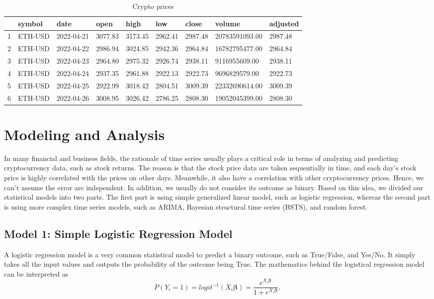 \documentclass{article}
\begin{document}
\begin{table}[ht]
\centering
\begin{tabular}{rllllllll}
  \hline
 & symbol & date & open & high & low & close & volume & adjusted \\ 
  \hline
1 & ETH-USD & 2022-04-21 & 3077.83 & 3173.45 & 2962.41 & 2987.48 & 20783591093.00 & 2987.48 \\ 
  2 & ETH-USD & 2022-04-22 & 2986.94 & 3024.85 & 2942.36 & 2964.84 & 16782795477.00 & 2964.84 \\ 
  3 & ETH-USD & 2022-04-23 & 2964.80 & 2975.32 & 2926.74 & 2938.11 & 9116955609.00 & 2938.11 \\ 
  4 & ETH-USD & 2022-04-24 & 2937.35 & 2961.88 & 2922.13 & 2922.73 & 9696829579.00 & 2922.73 \\ 
  5 & ETH-USD & 2022-04-25 & 2922.99 & 3018.42 & 2804.51 & 3009.39 & 22332690614.00 & 3009.39 \\ 
  6 & ETH-USD & 2022-04-26 & 3008.95 & 3026.42 & 2786.25 & 2808.30 & 19052045399.00 & 2808.30 \\ 
   \hline
\end{tabular}
\caption{Crypto prices} 
\label{Crypto prices}
\end{table}

\section{Modeling and Analysis}
In many financial and business fields, the rationale of time series usually plays a critical role in terms of analyzing and predicting cryptocurrency data, such as stock returns. The reason is that the stock price data are taken sequentially in time, and each day’s stock price is highly correlated with the prices on other days. Meanwhile, it also have a correlation with other cryptocurrency prices. Hence, we can’t assume the error are independent. In addition, we usually do not consider its outcome as binary. Based on this idea, we divided our statistical models into two parts. The first part is using simple generalized linear model, such as logistic regression, whereas the second part is using more complex time series models, such as ARIMA, Bayesian structural time series (BSTS), and random forest.\\

\subsection{Model 1: Simple Logistic Regression Model}
A logistic regression model is a very common statistical model to predict a binary outcome, such as True/False, and Yes/No. It simply takes all the input values and outputs the probability of the outcome being True. The mathematics behind the logistical regression model can be interpreted as
$$P(Y_i=1)=logit^{-1}(X_i\bm{\beta})=\frac{e^{X_i\bm{\beta}}}{1+e^{X_i\bm{\beta}}},$$
\end{document}
